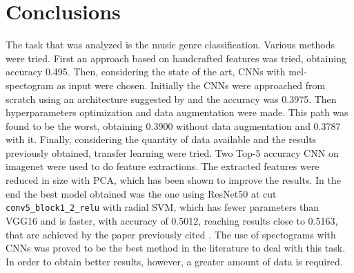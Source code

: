 \section{Conclusions}
The task that was analyzed is the music genre classification.
Various methods were tried.
First an approach based on handcrafted features was tried, obtaining accuracy 0.495.
Then, considering the state of the art, CNNs with mel-spectogram as input were chosen. 
Initially the CNNs were approached from scratch using an architecture suggested by \cite{kostrzewa2021music} and the accuracy was 0.3975. 
Then hyperparameters optimization and data augmentation were made. 
This path was found to be the worst, obtaining 0.3900 without data augmentation and 0.3787 with it.
Finally, considering the quantity of data available and the results previously obtained, transfer learning were tried.
Two Top-5 accuracy CNN on imagenet were used to do feature extractions.
The extracted features were reduced in size with PCA, which has been shown to improve the results.
In the end the best model obtained was the one using ResNet50 at cut \texttt{conv5\_block1\_2\_relu} with radial SVM, which has fewer parameters than VGG16 and is faster, with accuracy of 0.5012, reaching results close to 0.5163, that are achieved by the paper previously cited .
The use of spectograms with CNNs was proved to be the best method in the literature to deal with this task.
In order to obtain better results, however, a greater amount of data is required.
